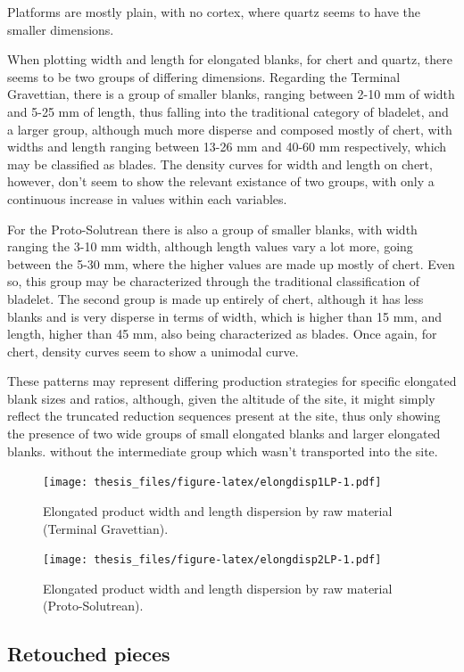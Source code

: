 \documentclass[12pt,twoside]{reedthesis}
\begin{document}
Platforms are mostly plain, with no cortex, where quartz seems to have the smaller dimensions.

When plotting width and length for elongated blanks, for chert and quartz, there seems to be two groups of differing dimensions. Regarding the Terminal Gravettian, there is a group of smaller blanks, ranging between 2-10 mm of width and 5-25 mm of length, thus falling into the traditional category of bladelet, and a larger group, although much more disperse and composed mostly of chert, with widths and length ranging between 13-26 mm and 40-60 mm respectively, which may be classified as blades. The density curves for width and length on chert, however, don't seem to show the relevant existance of two groups, with only a continuous increase in values within each variables.

For the Proto-Solutrean there is also a group of smaller blanks, with width ranging the 3-10 mm width, although length values vary a lot more, going between the 5-30 mm, where the higher values are made up mostly of chert. Even so, this group may be characterized through the traditional classification of bladelet. The second group is made up entirely of chert, although it has less blanks and is very disperse in terms of width, which is higher than 15 mm, and length, higher than 45 mm, also being characterized as blades. Once again, for chert, density curves seem to show a unimodal curve.

These patterns may represent differing production strategies for specific elongated blank sizes and ratios, although, given the altitude of the site, it might simply reflect the truncated reduction sequences present at the site, thus only showing the presence of two wide groups of small elongated blanks and larger elongated blanks. without the intermediate group which wasn't transported into the site.
\begin{figure}
\centering
\texttt{[image: thesis\_files/figure-latex/elongdisp1LP-1.pdf]}
\caption{\label{fig:elongdisp1LP}Elongated product width and length dispersion by raw material (Terminal Gravettian).}
\end{figure}
\begin{figure}
\centering
\texttt{[image: thesis\_files/figure-latex/elongdisp2LP-1.pdf]}
\caption{\label{fig:elongdisp2LP}Elongated product width and length dispersion by raw material (Proto-Solutrean).}
\end{figure}
\hypertarget{retouched-pieces}{%
\subsection{Retouched pieces}\label{retouched-pieces}}
\end{document}
